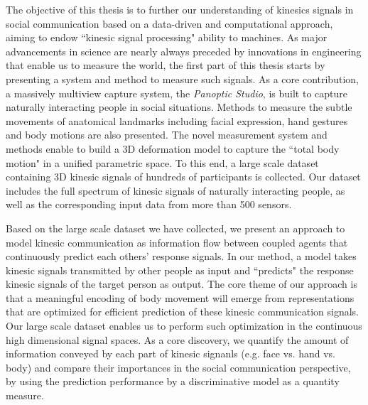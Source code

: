 The objective of this thesis is to further our understanding of kinesics signals in social communication based on a data-driven and computational approach, aiming to endow ``kinesic signal processing" ability to machines. As major advancements in science are nearly always preceded by innovations in engineering that enable us to measure the world, the first part of this thesis starts by presenting a system and method to measure such signals. As a core contribution, a massively multiview capture system, the \emph{Panoptic Studio}, is built to capture naturally interacting people in social situations. Methods to measure the subtle movements of anatomical landmarks including facial expression, hand gestures and body motions are also presented. The novel measurement system and methods enable to build a 3D deformation model to capture the ``total body motion" in a unified parametric space. To this end, a large scale dataset containing 3D kinesic signals of hundreds of participants is collected. Our dataset includes the full spectrum of kinesic signals of naturally interacting people, as well as the corresponding input data from more than 500 sensors.%

Based on the large scale dataset we have collected, we present an approach to model kinesic communication as information flow between coupled agents that continuously predict each others' response signals. In our method, a model takes kinesic signals transmitted by other people as input and ``predicts" the response kinesic signals of the target person as output. The core theme of our approach is that a meaningful encoding of body movement will emerge from representations that are optimized for efficient prediction of these kinesic communication signals. Our large scale dataset enables us to perform such optimization in the continuous high dimensional signal spaces. As a core discovery, we quantify the amount of information conveyed by each part of kinesic signanls (e.g. face vs. hand vs. body) and compare their importances in the social communication perspective, by using the prediction performance by a discriminative model as a quantity measure. %


